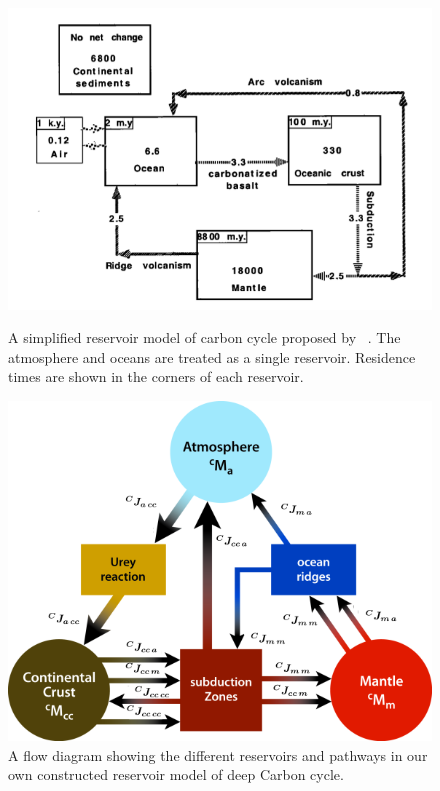 \begin{figure}[h!]
  \centering
  \includegraphics[scale=0.5]{Figures/SimplifiedModelSNH.png}
  \label{FIG:SNHZKBoxModelDiagramSimple}
  \caption{A simplified reservoir model of carbon cycle proposed by ~\citet{SNH-ZK:2001}. The atmosphere and oceans are treated as a single reservoir. Residence times are shown in the corners of each reservoir.}
\end{figure}

\begin{figure}[h!]
  \centering
  \includegraphics[scale=0.5]{Figures/RelabelJaniceFlowDiagram.png}
  \caption{A flow diagram showing the different reservoirs and pathways in our own constructed reservoir model of deep Carbon cycle.}
  \label{Fig:ReservoirFlowDiagram}
\end{figure}

